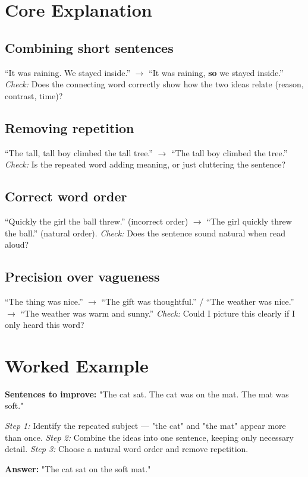 \section{Core Explanation}

\subsection*{Combining short sentences}
``It was raining. We stayed inside.'' $\rightarrow$ ``It was raining, \textbf{so} we stayed inside.'' \textit{Check:} Does the connecting word correctly show how the two ideas relate (reason, contrast, time)?

\subsection*{Removing repetition}
``The tall, tall boy climbed the tall tree.'' $\rightarrow$ ``The tall boy climbed the tree.'' \textit{Check:} Is the repeated word adding meaning, or just cluttering the sentence?

\subsection*{Correct word order}
``Quickly the girl the ball threw.'' (incorrect order) $\rightarrow$ ``The girl quickly threw the ball.'' (natural order). \textit{Check:} Does the sentence sound natural when read aloud?

\subsection*{Precision over vagueness}
``The thing was nice.'' $\rightarrow$ ``The gift was thoughtful.'' / ``The weather was nice.'' $\rightarrow$ ``The weather was warm and sunny.'' \textit{Check:} Could I picture this clearly if I only heard this word?

\section{Worked Example}
\begin{examplebox}
\textbf{Sentences to improve:} "The cat sat. The cat was on the mat. The mat was soft."

\textit{Step 1:} Identify the repeated subject --- "the cat" and "the mat" appear more than once.
\textit{Step 2:} Combine the ideas into one sentence, keeping only necessary detail.
\textit{Step 3:} Choose a natural word order and remove repetition.

\textbf{Answer:} "The cat sat on the soft mat."
\end{examplebox}

